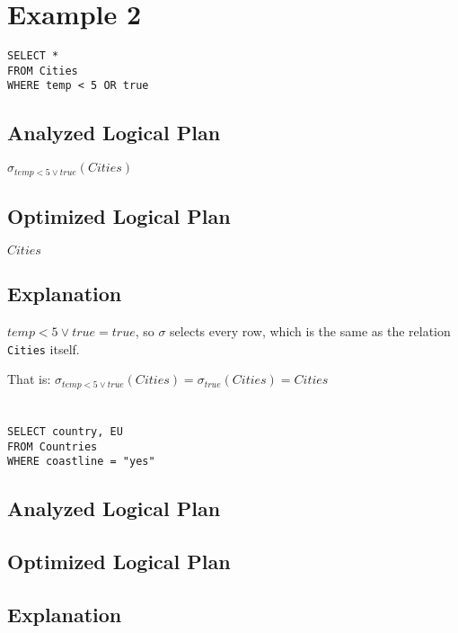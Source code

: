 \documentclass[12pt]{article}
\begin{document}
\newpage

\section*{Example 2}
\begin{verbatim}
SELECT *
FROM Cities
WHERE temp < 5 OR true
\end{verbatim}

\subsection*{Analyzed Logical Plan}
$\sigma_{temp < 5 \vee true}(Cities)$

\subsection*{Optimized Logical Plan}
$Cities$

\subsection*{Explanation}
$temp < 5 \vee true = true$, so $\sigma$ selects every row,
which is the same as the relation \verb|Cities| itself.

That is:
$\sigma_{temp < 5 \vee true}(Cities) = \sigma_{true}(Cities) = Cities$

\newpage

\section{}
\begin{verbatim}
SELECT country, EU
FROM Countries
WHERE coastline = "yes"
\end{verbatim}

\subsection*{Analyzed Logical Plan}
\vspace{2in}

\subsection*{Optimized Logical Plan}
\vspace{2in}

\subsection*{Explanation}
\end{document}
